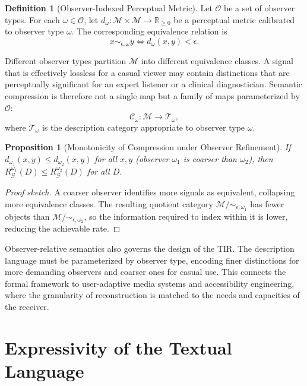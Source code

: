 \documentclass[11pt,a4paper]{article}
\newtheorem{proposition}[theorem]{Proposition}
\theoremstyle{definition}
\newtheorem{definition}[theorem]{Definition}
\theoremstyle{remark}
\begin{document}
\begin{definition}[Observer-Indexed Perceptual Metric]
Let $\mathcal{O}$ be a set of observer types. For each $\omega \in \mathcal{O}$, let $d_\omega : \mathcal{M} \times \mathcal{M} \rightarrow \mathbb{R}_{\ge 0}$ be a perceptual metric calibrated to observer type $\omega$. The corresponding equivalence relation is
\[
x \sim_{\epsilon,\omega} y \iff d_\omega(x,y) < \epsilon.
\]
\end{definition}

Different observer types partition $\mathcal{M}$ into different equivalence classes. A signal that is effectively lossless for a casual viewer may contain distinctions that are perceptually significant for an expert listener or a clinical diagnostician. Semantic compression is therefore not a single map but a family of maps parameterized by $\mathcal{O}$:
\[
\mathcal{C}_\omega : \mathcal{M} \rightarrow \mathcal{T}_\omega,
\]
where $\mathcal{T}_\omega$ is the description category appropriate to observer type $\omega$.

\begin{proposition}[Monotonicity of Compression under Observer Refinement]
If $d_{\omega_1}(x,y) \le d_{\omega_2}(x,y)$ for all $x,y$ (observer $\omega_1$ is coarser than $\omega_2$), then $R_{\mathcal{G}}^{\omega_1}(D) \le R_{\mathcal{G}}^{\omega_2}(D)$ for all $D$.
\end{proposition}

\begin{proof}[Proof sketch]
A coarser observer identifies more signals as equivalent, collapsing more equivalence classes. The resulting quotient category $\mathcal{M}/\!\sim_{\epsilon,\omega_1}$ has fewer objects than $\mathcal{M}/\!\sim_{\epsilon,\omega_2}$, so the information required to index within it is lower, reducing the achievable rate.
\end{proof}

Observer-relative semantics also governs the design of the TIR. The description language must be parameterized by observer type, encoding finer distinctions for more demanding observers and coarser ones for casual use. This connects the formal framework to user-adaptive media systems and accessibility engineering, where the granularity of reconstruction is matched to the needs and capacities of the receiver.

\section{Expressivity of the Textual Language}
\label{sec:expressivity}
\end{document}
